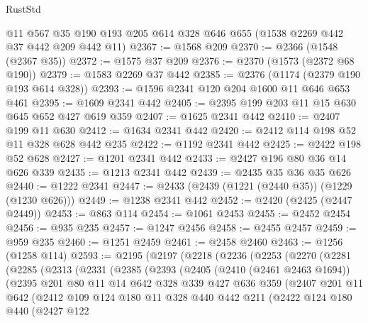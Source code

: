 \begin{lexlean}{RustStd}
\begin{coremodule}
    @11
    @567
    @35
    @190
    @193
    @205
    @614
    @328
    @646
    @655
    (@1538 @2269 @442 @37 @442 @209 @442 @11)
@2367 := @1568 @209
@2370 := @2366 (@1548 (@2367 @35))
@2372 := @1575 @37 @209
@2376 := @2370 (@1573 (@2372 @68 @190))
@2379 := @1583 @2269 @37 @442
@2385 := @2376 (@1174 (@2379 @190 @193 @614 @328))
@2393 := @1596 @2341 @120 @204 @1600 @11 @646 @653 @461
@2395 := @1609 @2341 @442
@2405 := @2395 @199 @203 @11 @15 @630 @645 @652 @427 @619 @359
@2407 := @1625 @2341 @442
@2410 := @2407 @199 @11 @630
@2412 := @1634 @2341 @442
@2420 := @2412 @114 @198 @52 @11 @328 @628 @442 @235
@2422 := @1192 @2341 @442
@2425 := @2422 @198 @52 @628
@2427 := @1201 @2341 @442
@2433 := @2427 @196 @80 @36 @14 @626 @339
@2435 := @1213 @2341 @442
@2439 := @2435 @35 @36 @35 @626
@2440 := @1222 @2341
@2447 := @2433 (@2439 (@1221 (@2440 @35)) (@1229 (@1230 @626)))
@2449 := @1238 @2341 @442
@2452 := @2420 (@2425 (@2447 @2449))
@2453 := @863 @114
@2454 := @1061 @2453
@2455 := @2452 @2454
@2456 := @935 @235
@2457 := @1247 @2456
@2458 := @2455 @2457
@2459 := @959 @235
@2460 := @1251 @2459
@2461 := @2458 @2460
@2463 := @1256 (@1258 @114)
@2593 := @2195
    (@2197
      (@2218
        (@2236
          (@2253
            (@2270
              (@2281
                (@2285
                  (@2313
                    (@2331
                      (@2385
                        (@2393
                          (@2405
                            (@2410 (@2461 @2463 @1694))
                            (@2395
                              @201
                              @80
                              @11
                              @14
                              @642
                              @328
                              @339
                              @427
                              @636
                              @359
                              (@2407
                                @201
                                @11
                                @642
                                (@2412
                                  @109
                                  @124
                                  @180
                                  @11
                                  @328
                                  @440
                                  @442
                                  @211
                                  (@2422
                                    @124
                                    @180
                                    @440
                                    (@2427
                                      @122

\end{coremodule}
\end{lexlean}
